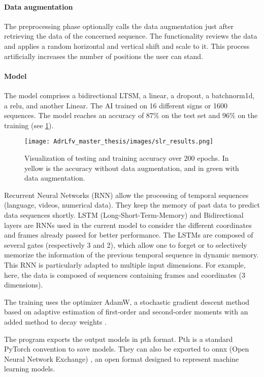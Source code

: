 \paragraph{Data augmentation}

The preprocessing phase optionally calls the data augmentation just after retrieving the data of the concerned sequence. The functionality reviews the data and applies a random horizontal and vertical shift and scale to it. This process artificially increases the number of positions the user can stand.

\paragraph{Model}

The model comprises a bidirectional LTSM, a linear, a dropout, a batchnorm1d, a relu, and another Linear. The AI trained on 16 different signs or 1600 sequences. The model reaches an accuracy of 87\% on the test set and 96\% on the training (see \ref{fig:slr_results}).

\begin{figure}[h]
    \centering
    \texttt{[image: AdrLfv\_master\_thesis/images/slr\_results.png]}
    \caption{Visualization of testing and training accuracy over 200 epochs. In yellow is the accuracy without data augmentation, and in green with data augmentation.}
    \label{fig:slr_results}
\end{figure}

Recurrent Neural Networks (RNN) allow the processing of temporal sequences (language, videos, numerical data). They keep the memory of past data to predict data sequences shortly. 
LSTM (Long-Short-Term-Memory) and Bidirectional layers are RNNs used in the current model to consider the different coordinates and frames already passed for better performance. The LSTMs are composed of several gates (respectively 3 and 2), which allow one to forget or to selectively memorize the information of the previous temporal sequence in dynamic memory. This RNN is particularly adapted to multiple input dimensions. For example, here, the data is composed of sequences containing frames and coordinates (3 dimensions).
  
The training uses the optimizer AdamW, a stochastic gradient descent method based on adaptive estimation of first-order and second-order moments with an added method to decay weights \cite{loshchilov2017decoupled}. 

The program exports the output models in pth format. Pth is a standard PyTorch convention to save models. They can also be exported to onnx (Open Neural Network Exchange) \cite{onnx}, an open format designed to represent machine learning models.

